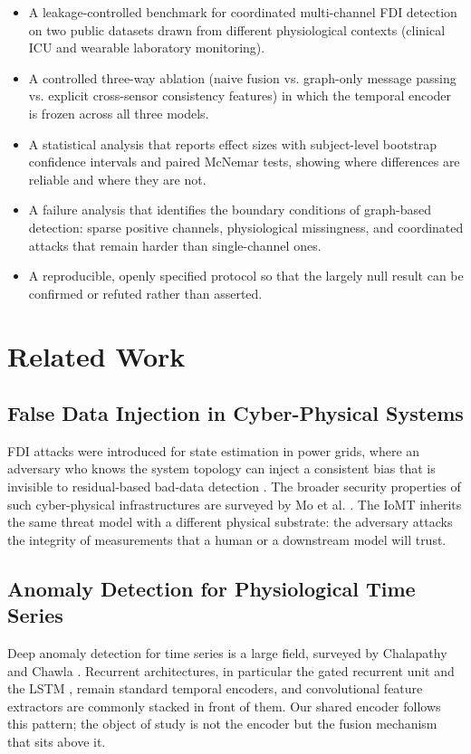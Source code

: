 \documentclass[conference]{IEEEtran}
\begin{document}
\begin{itemize}
\item A leakage-controlled benchmark for coordinated multi-channel FDI detection on two public datasets drawn from different physiological contexts (clinical ICU and wearable laboratory monitoring).
\item A controlled three-way ablation (naive fusion vs. graph-only message passing vs. explicit cross-sensor consistency features) in which the temporal encoder is frozen across all three models.
\item A statistical analysis that reports effect sizes with subject-level bootstrap confidence intervals and paired McNemar tests, showing where differences are reliable and where they are not.
\item A failure analysis that identifies the boundary conditions of graph-based detection: sparse positive channels, physiological missingness, and coordinated attacks that remain harder than single-channel ones.
\item A reproducible, openly specified protocol so that the largely null result can be confirmed or refuted rather than asserted.
\end{itemize}
\section{Related Work}
\subsection{False Data Injection in Cyber-Physical Systems}
FDI attacks were introduced for state estimation in power grids, where an adversary who knows the system topology can inject a consistent bias that is invisible to residual-based bad-data detection \cite{liu2011}. The broader security properties of such cyber-physical infrastructures are surveyed by Mo et al. \cite{mo2012}. The IoMT inherits the same threat model with a different physical substrate: the adversary attacks the integrity of measurements that a human or a downstream model will trust.
\subsection{Anomaly Detection for Physiological Time Series}
Deep anomaly detection for time series is a large field, surveyed by Chalapathy and Chawla \cite{chalapathy2019}. Recurrent architectures, in particular the gated recurrent unit \cite{cho2014} and the LSTM \cite{hochreiter1997}, remain standard temporal encoders, and convolutional feature extractors are commonly stacked in front of them. Our shared encoder follows this pattern; the object of study is not the encoder but the fusion mechanism that sits above it.
\end{document}
